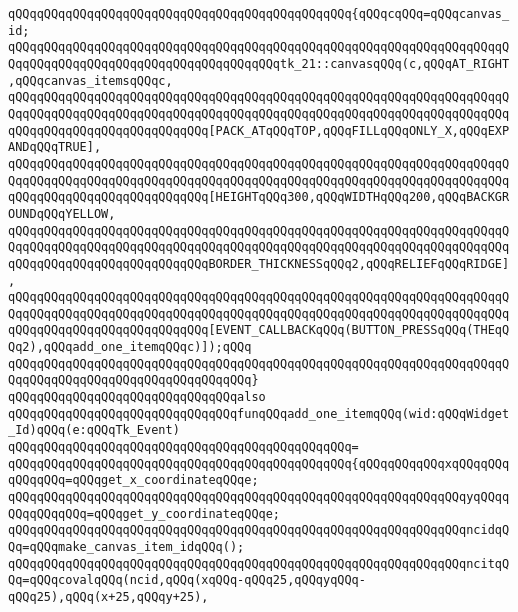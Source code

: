 \verb|qQQqqQQqqQQqqQQqqQQqqQQqqQQqqQQqqQQqqQQqqQQqqQQq{qQQqcqQQq=qQQqcanvas_id;|\newline
\verb|qQQqqQQqqQQqqQQqqQQqqQQqqQQqqQQqqQQqqQQqqQQqqQQqqQQqqQQqqQQqqQQqqQQqqQQqqQQqqQQqqQQqqQQqqQQqqQQqqQQqqQQqqQQqtk_21::canvasqQQq(c,qQQqAT_RIGHT,qQQqcanvas_itemsqQQqc,|\newline
\verb|qQQqqQQqqQQqqQQqqQQqqQQqqQQqqQQqqQQqqQQqqQQqqQQqqQQqqQQqqQQqqQQqqQQqqQQqqQQqqQQqqQQqqQQqqQQqqQQqqQQqqQQqqQQqqQQqqQQqqQQqqQQqqQQqqQQqqQQqqQQqqQQqqQQqqQQqqQQqqQQqqQQqqQQq[PACK_ATqQQqTOP,qQQqFILLqQQqONLY_X,qQQqEXPANDqQQqTRUE],|\newline
\verb|qQQqqQQqqQQqqQQqqQQqqQQqqQQqqQQqqQQqqQQqqQQqqQQqqQQqqQQqqQQqqQQqqQQqqQQqqQQqqQQqqQQqqQQqqQQqqQQqqQQqqQQqqQQqqQQqqQQqqQQqqQQqqQQqqQQqqQQqqQQqqQQqqQQqqQQqqQQqqQQqqQQqqQQq[HEIGHTqQQq300,qQQqWIDTHqQQq200,qQQqBACKGROUNDqQQqYELLOW,|\newline
\verb|qQQqqQQqqQQqqQQqqQQqqQQqqQQqqQQqqQQqqQQqqQQqqQQqqQQqqQQqqQQqqQQqqQQqqQQqqQQqqQQqqQQqqQQqqQQqqQQqqQQqqQQqqQQqqQQqqQQqqQQqqQQqqQQqqQQqqQQqqQQqqQQqqQQqqQQqqQQqqQQqqQQqqQQqBORDER_THICKNESSqQQq2,qQQqRELIEFqQQqRIDGE],|\newline
\verb|qQQqqQQqqQQqqQQqqQQqqQQqqQQqqQQqqQQqqQQqqQQqqQQqqQQqqQQqqQQqqQQqqQQqqQQqqQQqqQQqqQQqqQQqqQQqqQQqqQQqqQQqqQQqqQQqqQQqqQQqqQQqqQQqqQQqqQQqqQQqqQQqqQQqqQQqqQQqqQQqqQQqqQQq[EVENT_CALLBACKqQQq(BUTTON_PRESSqQQq(THEqQQq2),qQQqadd_one_itemqQQqc)]);qQQq|\newline
\verb|qQQqqQQqqQQqqQQqqQQqqQQqqQQqqQQqqQQqqQQqqQQqqQQqqQQqqQQqqQQqqQQqqQQqqQQqqQQqqQQqqQQqqQQqqQQqqQQqqQQqqQQq}|\newline
\newline
\verb|qQQqqQQqqQQqqQQqqQQqqQQqqQQqqQQqalso|\newline
\verb|qQQqqQQqqQQqqQQqqQQqqQQqqQQqqQQqfunqQQqadd_one_itemqQQq(wid:qQQqWidget_Id)qQQq(e:qQQqTk_Event)|\newline
\verb|qQQqqQQqqQQqqQQqqQQqqQQqqQQqqQQqqQQqqQQqqQQqqQQq=|\newline
\verb|qQQqqQQqqQQqqQQqqQQqqQQqqQQqqQQqqQQqqQQqqQQqqQQq{qQQqqQQqqQQqxqQQqqQQqqQQqqQQq=qQQqget_x_coordinateqQQqe;|\newline
\verb|qQQqqQQqqQQqqQQqqQQqqQQqqQQqqQQqqQQqqQQqqQQqqQQqqQQqqQQqqQQqqQQqyqQQqqQQqqQQqqQQq=qQQqget_y_coordinateqQQqe;|\newline
\verb|qQQqqQQqqQQqqQQqqQQqqQQqqQQqqQQqqQQqqQQqqQQqqQQqqQQqqQQqqQQqqQQqncidqQQq=qQQqmake_canvas_item_idqQQq();|\newline
\verb|qQQqqQQqqQQqqQQqqQQqqQQqqQQqqQQqqQQqqQQqqQQqqQQqqQQqqQQqqQQqqQQqncitqQQq=qQQqcovalqQQq(ncid,qQQq(xqQQq-qQQq25,qQQqyqQQq-qQQq25),qQQq(x+25,qQQqy+25),|\newline

